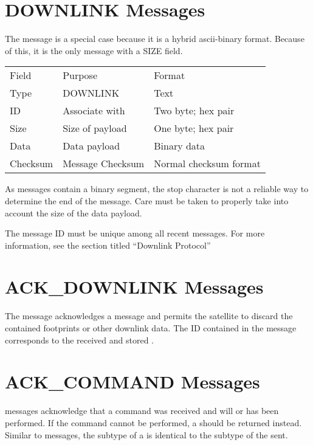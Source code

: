\documentclass{article}
\begin{document}
\section{DOWNLINK Messages}
  The \mdownlink message is a special case because it is a hybrid ascii-binary 
  format. Because of this, it is the only message with a SIZE field.
  
  \begin{center}
  \begin{tabular}{| l | l | l |}
   \hline
  	Field & Purpose & Format \\
  	Type & DOWNLINK & Text \\
  	ID & Associate \mdownlink with \madownlink & Two byte; hex pair \\
  	Size & Size of payload & One byte; hex pair \\
  	Data & Data payload & Binary data \\
  	Checksum & Message Checksum & Normal checksum format \\
   \hline
  \end{tabular}
  \end{center}
  	
  As \mdownlink messages contain a binary segment, the stop character is not
  a reliable way to determine the end of the message. Care must be taken to 
  properly take into account the size of the data payload.
 
  The message ID must be unique among all recent messages. For more
  information, see the section titled ``Downlink Protocol''
  
\section{ACK\_DOWNLINK Messages}
	The \madownlink message acknowledges a \mdownlink message and permits the
	satellite to discard the contained footprints or other downlink data. The 
	ID contained in the \madownlink message corresponds to the received and
	stored \mdownlink.
	
\section{ACK\_COMMAND Messages}
  \macommand messages acknowledge that a command was received and will or has been performed. If
  the command cannot be performed, a \merror should be returned instead. Similar to \mresult messages,
  the subtype of a \macommand is identical to the subtype of the \mcommand sent.
  
\end{document}
